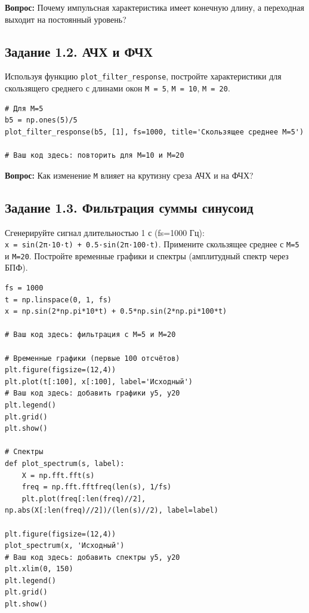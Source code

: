 \documentclass[12pt,a4paper,openany]{book}
\begin{document}
\textbf{Вопрос:} Почему импульсная характеристика имеет конечную длину, а переходная выходит на постоянный уровень?

\subsection*{Задание 1.2. АЧХ и ФЧХ}

Используя функцию \texttt{plot\_\allowbreak{}filter\_\allowbreak{}response}, постройте характеристики для скользящего среднего с длинами окон \texttt{M\ =\allowbreak{}\ 5}, \texttt{M\ =\allowbreak{}\ 10}, \texttt{M\ =\allowbreak{}\ 20}.

\begin{Verbatim}[fontsize=\small, breaklines, breakanywhere, frame=single, framesep=2mm]
# Для M=5
b5 = np.ones(5)/5
plot_filter_response(b5, [1], fs=1000, title='Скользящее среднее M=5')

# Ваш код здесь: повторить для M=10 и M=20
\end{Verbatim}

\textbf{Вопрос:} Как изменение \texttt{M} влияет на крутизну среза АЧХ и на ФЧХ?

\subsection*{Задание 1.3. Фильтрация суммы синусоид}

Сгенерируйте сигнал длительностью 1 с (fs=1000 Гц): \texttt{x\ =\allowbreak{}\ sin(\allowbreak{}2π·10·t)\ +\ 0.\allowbreak{}5·sin(\allowbreak{}2π·100·t)}. Примените скользящее среднее с \texttt{M=\allowbreak{}5} и \texttt{M=\allowbreak{}20}. Постройте временные графики и спектры (амплитудный спектр через БПФ).

\begin{Verbatim}[fontsize=\small, breaklines, breakanywhere, frame=single, framesep=2mm]
fs = 1000
t = np.linspace(0, 1, fs)
x = np.sin(2*np.pi*10*t) + 0.5*np.sin(2*np.pi*100*t)

# Ваш код здесь: фильтрация с M=5 и M=20

# Временные графики (первые 100 отсчётов)
plt.figure(figsize=(12,4))
plt.plot(t[:100], x[:100], label='Исходный')
# Ваш код здесь: добавить графики y5, y20
plt.legend()
plt.grid()
plt.show()

# Спектры
def plot_spectrum(s, label):
    X = np.fft.fft(s)
    freq = np.fft.fftfreq(len(s), 1/fs)
    plt.plot(freq[:len(freq)//2], np.abs(X[:len(freq)//2])/(len(s)//2), label=label)

plt.figure(figsize=(12,4))
plot_spectrum(x, 'Исходный')
# Ваш код здесь: добавить спектры y5, y20
plt.xlim(0, 150)
plt.legend()
plt.grid()
plt.show()
\end{Verbatim}
\end{document}
